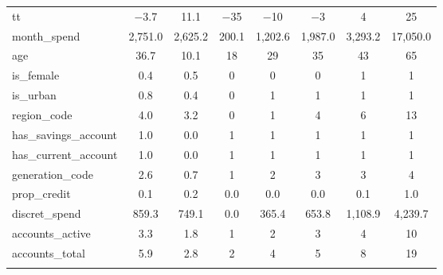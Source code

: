\begin{table}[H]
\begin{tabular}{@{\extracolsep{5pt}}lccccccc}
tt & $-$3.7 & 11.1 & $-$35 & $-$10 & $-$3 & 4 & 25 \\ 
month\_spend & 2,751.0 & 2,625.2 & 200.1 & 1,202.6 & 1,987.0 & 3,293.2 & 17,050.0 \\ 
age & 36.7 & 10.1 & 18 & 29 & 35 & 43 & 65 \\ 
is\_female & 0.4 & 0.5 & 0 & 0 & 0 & 1 & 1 \\ 
is\_urban & 0.8 & 0.4 & 0 & 1 & 1 & 1 & 1 \\ 
region\_code & 4.0 & 3.2 & 0 & 1 & 4 & 6 & 13 \\ 
has\_savings\_account & 1.0 & 0.0 & 1 & 1 & 1 & 1 & 1 \\ 
has\_current\_account & 1.0 & 0.0 & 1 & 1 & 1 & 1 & 1 \\ 
generation\_code & 2.6 & 0.7 & 1 & 2 & 3 & 3 & 4 \\ 
prop\_credit & 0.1 & 0.2 & 0.0 & 0.0 & 0.0 & 0.1 & 1.0 \\ 
discret\_spend & 859.3 & 749.1 & 0.0 & 365.4 & 653.8 & 1,108.9 & 4,239.7 \\ 
accounts\_active & 3.3 & 1.8 & 1 & 2 & 3 & 4 & 10 \\ 
accounts\_total & 5.9 & 2.8 & 2 & 4 & 5 & 8 & 19 \\ 
\hline \\[-1.8ex] 
\end{tabular} 
\end{table} 
